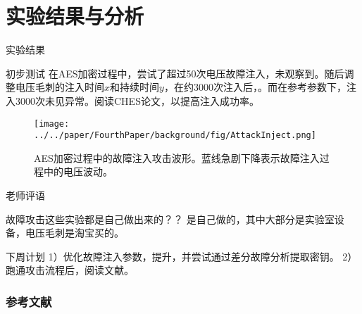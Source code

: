 \documentclass{beamer}
\begin{document}
\section{实验结果与分析}
\begin{frame}{实验结果}
  \begin{block}{初步测试}
    在AES加密过程中，尝试了超过50次电压故障注入，未观察到。随后调整电压毛刺的注入时间$x$和持续时间$y$，在约3000次注入后，。而在参考参数下，注入3000次未见异常。阅读CHES论文\cite{TCHES:BozFocPal19}，以提高注入成功率。
  \end{block}
  \begin{figure}
    \centering
    \texttt{[image: ../../paper/FourthPaper/background/fig/AttackInject.png]}
    \caption{AES加密过程中的故障注入攻击波形。蓝线急剧下降表示故障注入过程中的电压波动。}
  \end{figure}
\end{frame}

\begin{frame}{老师评语}
  \begin{alertblock}{故障攻击这些实验都是自己做出来的？？}
    是自己做的，其中大部分是实验室设备，电压毛刺是淘宝买的。
  \end{alertblock}
 
  \begin{block}{下周计划}
    1）优化故障注入参数，提升，并尝试通过差分故障分析提取密钥。
    2）跑通攻击流程后，阅读文献。
  \end{block}
\end{frame}

\begin{frame}
  \frametitle{参考文献}
  
  
\end{frame}
\end{document}
